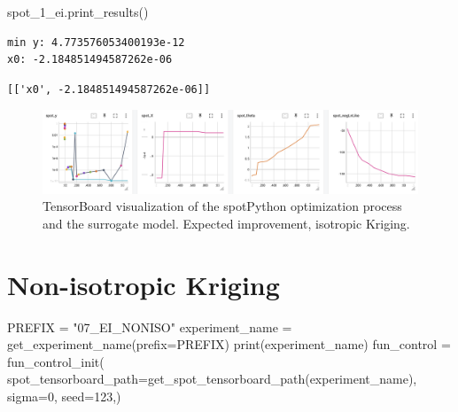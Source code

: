 \documentclass[
  letterpaper,
  DIV=11,
  numbers=noendperiod]{scrreprt}
\newenvironment{Shaded}{\begin{snugshade}}{\end{snugshade}}
\newcommand{\BuiltInTok}[1]{\textcolor[rgb]{0.00,0.23,0.31}{#1}}
\newcommand{\DecValTok}[1]{\textcolor[rgb]{0.68,0.00,0.00}{#1}}
\newcommand{\NormalTok}[1]{\textcolor[rgb]{0.00,0.23,0.31}{#1}}
\newcommand{\OperatorTok}[1]{\textcolor[rgb]{0.37,0.37,0.37}{#1}}
\newcommand{\StringTok}[1]{\textcolor[rgb]{0.13,0.47,0.30}{#1}}
\begin{document}
\begin{Shaded}
\begin{Highlighting}[]
\NormalTok{spot\_1\_ei.print\_results()}
\end{Highlighting}
\end{Shaded}

\begin{verbatim}
min y: 4.773576053400193e-12
x0: -2.184851494587262e-06
\end{verbatim}

\begin{verbatim}
[['x0', -2.184851494587262e-06]]
\end{verbatim}

\begin{figure}

{\centering \includegraphics[width=1\textwidth,height=\textheight]{figures_static/07_tensorboard_EI_ISO.png}

}

\caption{TensorBoard visualization of the spotPython optimization
process and the surrogate model. Expected improvement, isotropic
Kriging.}

\end{figure}

\hypertarget{non-isotropic-kriging}{%
\section{Non-isotropic Kriging}\label{non-isotropic-kriging}}

\begin{Shaded}
\begin{Highlighting}[]
\NormalTok{PREFIX }\OperatorTok{=} \StringTok{"07\_EI\_NONISO"}
\NormalTok{experiment\_name }\OperatorTok{=}\NormalTok{ get\_experiment\_name(prefix}\OperatorTok{=}\NormalTok{PREFIX)}
\BuiltInTok{print}\NormalTok{(experiment\_name)}
\NormalTok{fun\_control }\OperatorTok{=}\NormalTok{ fun\_control\_init(}
\NormalTok{    spot\_tensorboard\_path}\OperatorTok{=}\NormalTok{get\_spot\_tensorboard\_path(experiment\_name),}
\NormalTok{    sigma}\OperatorTok{=}\DecValTok{0}\NormalTok{,}
\NormalTok{    seed}\OperatorTok{=}\DecValTok{123}\NormalTok{,)}
\end{Highlighting}
\end{Shaded}
\end{document}
